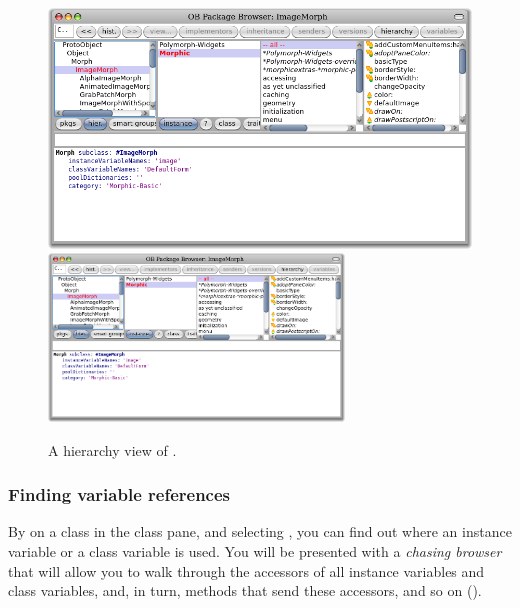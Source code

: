 \documentclass[a4paper,10pt,twoside]{book}
\begin{document}
\begin{figure}[btp]
	\begin{center}
	\ifluluelse
		{\includegraphics[width=\textwidth]{hierarchyBrowser}}
		{\includegraphics[width=0.7\textwidth]{hierarchyBrowser}}
	\end{center}
	\caption{A hierarchy view of .}
\end{figure}

\subsubsection{Finding variable references}

By  on a class in the class pane, and selecting , you can find out where an instance variable or a class variable is used.
You will be presented with a \emph{chasing browser} that will allow you to walk through the accessors of all instance variables and class variables, and, in turn, methods that send these accessors, and so on ().
\end{document}
